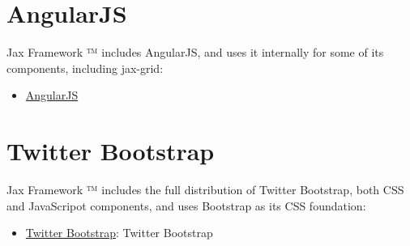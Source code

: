 \documentclass[letterpaper,10pt,english]{sphinxmanual}
\begin{document}
\section{AngularJS}
\label{jaxFrameworkGuide:id2}
Jax Framework ™ includes AngularJS, and uses it internally for some of its components,
including jax-grid:
\begin{itemize}
\item {} 
\href{https://angularjs.org/}{AngularJS}

\end{itemize}


\section{Twitter Bootstrap}
\label{jaxFrameworkGuide:id4}
Jax Framework ™ includes the full distribution of Twitter Bootstrap, both CSS and JavaScripot
components, and uses Bootstrap as its CSS foundation:
\begin{itemize}
\item {} 
\href{http://twitter.github.com/bootstrap/}{Twitter Bootstrap}: Twitter Bootstrap

\end{itemize}
\end{document}
